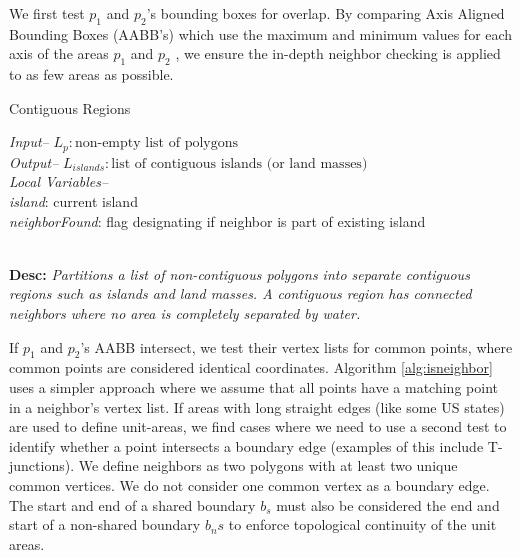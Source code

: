 We first test $p_1$ and $p_2$'s bounding boxes for overlap. By comparing Axis Aligned Bounding Boxes (AABB's) which use the maximum and minimum values for each axis of the areas $p_1$ and $p_2$ \cite{ericson2004real}, we ensure the in-depth neighbor checking is applied to as few areas as possible.
  
\begin{algorithm}[h]
\footnotesize
\caption{Contiguous Regions}
\emph{Input--} $L_{p}: \text{non-empty list of polygons}$\\
\emph{Output--} $L_{islands}: \text{list of contiguous islands (or land masses)}$\\
\emph{Local Variables--}\\
\textit{island}: current island\\
\textit{neighborFound}: flag designating if neighbor is part of existing island

\begin{algorithmic}[1] 
\IfEnd
{}
\IfEnd
{}
\WhileEnd
{}
\EndProcedure
\end{algorithmic} \label{alg:contiguous}

~\\
\textbf{Desc: }\emph{Partitions a list of non-contiguous polygons into separate contiguous regions such as islands and land masses. A contiguous region has connected neighbors where no area is completely separated by water. }
\end{algorithm}


If $p_1$ and $p_2$'s AABB intersect, we test their vertex lists for common points, where common points are considered identical coordinates. Algorithm \ref{alg:isneighbor} uses a simpler approach where we assume that all points have a matching point in a neighbor's vertex list. If areas with long straight edges (like some US states) are used to define unit-areas, we find cases where we need to use a second test to identify whether a point intersects a boundary edge (examples of this include T-junctions). We define neighbors as two polygons with at least two unique common vertices. We do not consider one common vertex as a boundary edge. The start and end of a shared boundary $b_s$ must also be considered the end and start of a non-shared boundary $b_ns$ to enforce topological continuity of the unit areas. 

